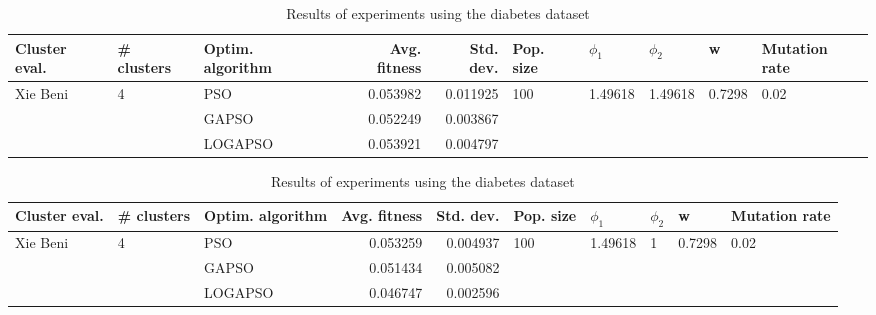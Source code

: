 \documentclass{article}
\begin{document}
\begin{table}
\centering
\caption{Results of experiments using the diabetes dataset}
\begin{tabular}{lllrrlllll}
\toprule
            Cluster eval. &        \# clusters & Optim. algorithm &  Avg. fitness &  Std. dev. &            Pop. size &               $\phi_{1}$ &               $\phi_{2}$ &                       w &         Mutation rate \\
\midrule
\multirow{3}{*}{Xie Beni} & \multirow{3}{*}{4} &              PSO &      0.053982 &   0.011925 & \multirow{3}{*}{100} & \multirow{3}{*}{1.49618} & \multirow{3}{*}{1.49618} & \multirow{3}{*}{0.7298} & \multirow{3}{*}{0.02} \\
                          &                    &            GAPSO &      0.052249 &   0.003867 &                      &                          &                          &                         &                       \\
                          &                    &          LOGAPSO &      0.053921 &   0.004797 &                      &                          &                          &                         &                       \\
\bottomrule
\end{tabular}
\end{table}
\begin{table}
\centering
\caption{Results of experiments using the diabetes dataset}
\begin{tabular}{lllrrlllll}
\toprule
            Cluster eval. &        \# clusters & Optim. algorithm &  Avg. fitness &  Std. dev. &            Pop. size &               $\phi_{1}$ &         $\phi_{2}$ &                       w &         Mutation rate \\
\midrule
\multirow{3}{*}{Xie Beni} & \multirow{3}{*}{4} &              PSO &      0.053259 &   0.004937 & \multirow{3}{*}{100} & \multirow{3}{*}{1.49618} & \multirow{3}{*}{1} & \multirow{3}{*}{0.7298} & \multirow{3}{*}{0.02} \\
                          &                    &            GAPSO &      0.051434 &   0.005082 &                      &                          &                    &                         &                       \\
                          &                    &          LOGAPSO &      0.046747 &   0.002596 &                      &                          &                    &                         &                       \\
\bottomrule
\end{tabular}
\end{table}
\end{document}
